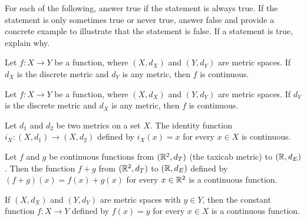 \item For each of the following, answer true if the statement is always true. If the statement is only sometimes true or never true, answer false and provide a concrete example to illustrate that the statement is false. If a statement is true, explain why. 

	\ba
	\item Let $f : X \to Y$ be a function, where $(X, d_X)$ and $(Y, d_Y)$ are metric spaces. If $d_X$ is the discrete metric and $d_Y$ is any metric, then $f$ is continuous.
	
	\item Let $f : X \to Y$ be a function, where $(X, d_X)$ and $(Y, d_Y)$ are metric spaces. If $d_Y$ is the discrete metric and $d_X$ is any metric, then $f$ is continuous.

	\item Let $d_1$ and $d_2$ be two metrics on a set $X$. The identity function $i_X : (X,d_1) \to (X,d_2)$ defined by $i_X(x) = x$ for every $x \in X$ is continuous. 
	
	\item Let $f$ and $g$ be continuous functions from $(\mathbb{R}^2, d_T)$ (the taxicab metric) to $(\mathbb{R},d_E)$. Then the function $f+g$ from $(\mathbb{R}^2, d_T)$ to $(\mathbb{R},d_E)$ defined by $(f+g)(x) = f(x) + g(x)$ for every $x \in \mathbb{R}^2$ is a continuous function.  
	
	\item If $(X, d_X)$ and $(Y,d_Y)$ are metric spaces with $y \in Y$, then the constant function $f: X \to Y$ defined by $f(x) = y$ for every $x \in X$ is a continuous function.
		
	\ea

